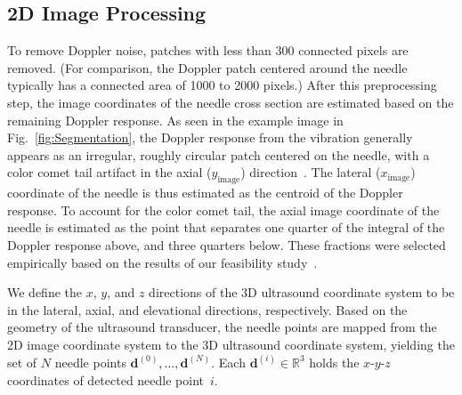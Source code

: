 \subsection{2D Image Processing}
To remove Doppler noise, patches with less than 300 connected pixels are removed. (For comparison, the Doppler patch centered around the needle typically has a connected area of 1000 to 2000 pixels.) After this preprocessing step, the image coordinates of the needle cross section are estimated based on the remaining Doppler response. As seen in the example image in Fig.~\ref{fig:Segmentation}, the Doppler response from the vibration generally appears as an irregular, roughly circular patch centered on the needle, with a color comet tail artifact in the axial ($y_\text{image}$) direction~\cite{Tchelepi2009}. The lateral ($x_\text{image}$) coordinate of the needle is thus estimated as the centroid of the Doppler response. To account for the color comet tail, the axial image coordinate of the needle is estimated as the point that separates one quarter of the integral of the Doppler response above, and three quarters below. These fractions were selected empirically based on the results of our feasibility study~\cite{Adebar2013}. 

We define the $x$, $y$, and $z$ directions of the 3D ultrasound coordinate system to be in the lateral, axial, and elevational directions, respectively. Based on the geometry of the ultrasound transducer, the needle points are mapped from the 2D image coordinate system to the 3D ultrasound coordinate system, yielding the set of $N$ needle points $\bm{d}^{(0)}, \dotsc, \bm{d}^{(N)}$. Each $\bm{d}^{(i)} \in \mathbb{R}^{3}$ holds the $x$-$y$-$z$ coordinates of detected needle point~$i$.


